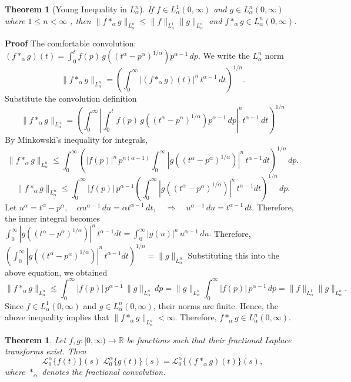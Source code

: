 \documentclass[two side,reqno,12pt]{amsart}
\numberwithin{equation}{section}
\newtheorem{theorem}[lemma]{Theorem}
\theoremstyle{definition}
\begin{document}
\begin{theorem}[Young Inequality in $L^n_\alpha$]
    If \(f \in L^1_\alpha(0,\infty)\) and \(g \in L^n_\alpha(0,\infty)\) where $1 \leq n < \infty$ , then 
    $
    \|f *_\alpha g\|_{L^n_\alpha} \leq \|f\|_{L^1_\alpha} \|g\|_{L^n_\alpha}$ and \(f *_\alpha g \in L^n_\alpha(0,\infty)\).
    
\end{theorem}
\textbf{Proof}
The comfortable convolution:
$
(f *_\alpha g)(t) = \int_0^t f(p) \, g\!\left((t^\alpha - p^\alpha)^{1/\alpha}\right) p^{\alpha-1} \, dp.
$
We write the $L^n_\alpha$ norm
\[
\|f *_\alpha g\|_{L^n_\alpha} = \left( \int_0^\infty |(f *_\alpha g)(t)|^n \, t^{\alpha-1}\,dt \right)^{1/n}.
\]
Substitute the convolution definition
\[
\|f *_\alpha g\|_{L^n_\alpha} = \left( \int_0^\infty \left| \int_0^t f(p) \, g\!\left((t^\alpha - p^\alpha)^{1/\alpha}\right) p^{\alpha-1} \, dp \right|^n t^{\alpha-1} \, dt \right)^{1/n}
\]
By Minkowski’s inequality for integrals,
\[
\|f *_\alpha g\|_{L^n_\alpha} \leq \int_0^\infty  \left( |f(p)|^n \, p^{n(\alpha-1)}\int_0^\infty |g((t^\alpha - p^\alpha)^{1/\alpha})|^n \, t^{\alpha-1} dt \right)^{1/n} \, dp.
\]
\[
\|f *_\alpha g\|_{L^n_\alpha} \leq \int_0^\infty |f(p)| \, p^{\alpha-1} \left( \int_0^\infty |g((t^\alpha - p^\alpha)^{1/\alpha})|^n \, t^{\alpha-1} dt \right)^{1/n} \, dp. 
\]
Let
$ u^\alpha = t^\alpha - p^\alpha, \quad \alpha u^{\alpha-1} \, du = \alpha t^{\alpha-1} \, dt, \quad\Rightarrow\quad u^{\alpha-1} \, du = t^{\alpha-1} \, dt.$
Therefore, the inner integral becomes$
\int_0^\infty |g((t^\alpha - p^\alpha)^{1/\alpha})|^n \, t^{\alpha-1} dt = \int_0^\infty |g(u)|^n \, u^{\alpha-1} \, du.
$ Therefore, $
\left( \int_0^\infty |g((t^\alpha - p^\alpha)^{1/\alpha})|^n \, t^{\alpha-1} dt \right)^{1/n} = \|g\|_{L^n_\alpha}
$
Substituting this into the above equation, we obtained
\[
\|f *_\alpha g\|_{L^n_\alpha} \leq \int_0^\infty |f(p)| \, p^{\alpha-1} \, \|g\|_{L^n_\alpha} \, dp= \|g\|_{L^n_\alpha} \int_0^\infty |f(p)| \, p^{\alpha-1} \, dp = \|f\|_{L^1_\alpha} \|g\|_{L^n_\alpha}.
\]
Since $f \in L_{\alpha}^{1}(0,\infty)$ and $g \in L_{\alpha}^{n}(0,\infty)$, their norms are finite. Hence, the above inequality implies that 
\(
\|f *_{\alpha} g\|_{L_{\alpha}^{n}} < \infty .
\) 
Therefore, 
\(
f *_{\alpha} g \in L_{\alpha}^{n}(0,\infty).
\)
\begin{theorem}
     Let \( f, g : [0, \infty) \to \mathbb{R} \) be functions such that their fractional Laplace transforms exist. Then
\[
\mathcal{L}_0^{\alpha}\{f(t)\}(s) \; \mathcal{L}_0^{\alpha}\{g(t)\}(s) = \mathcal{L}_0^{\alpha}\{(f *_{\alpha} g)(t)\}(s), 
\]
where \( *_{\alpha} \) denotes the fractional convolution.
\end{theorem}
\end{document}
